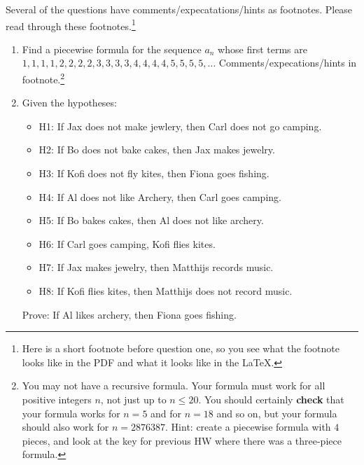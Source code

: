 \documentclass{article}
\begin{document}
\noindent Several of the questions have comments/expecatations/hints as footnotes. Please read through these footnotes.\footnote{Here is a short footnote before question one, so you see what the footnote looks like in the PDF and what it looks like in the LaTeX.}
\begin{enumerate}

    \item Find a piecewise formula for the sequence $a_n$ whose first terms are\vskip1pt
          $1,1,1,1,2,2,2,2,3,3,3,3,4,4,4,4,5,5,5,5,\dots$\vskip1pt
          Comments/expecations/hints in footnote.\footnote{You may not have a recursive
              formula. Your formula must work for all positive integers $n$, not just up to
              $n \leq 20$. You should certainly {\bf check} that your formula works for $n=5$
              and for $n=18$ and so on, but your formula should also work for $n=2876387$.
              Hint: create a piecewise formula with $4$ pieces, and look at the key for
              previous HW where there was a three-piece formula.}

          \newpage

    \item Given the hypotheses:
          \begin{itemize}
              \item H1: If Jax does not make jewlery, then Carl does not go camping. 
              \item H2: If Bo does not bake cakes, then Jax makes jewelry. 
              \item H3: If Kofi does not fly kites, then Fiona goes fishing. 
              \item H4: If Al does not like Archery, then Carl goes camping. 
              \item H5: If Bo bakes cakes, then Al does not like archery. 
              \item H6: If Carl goes camping, Kofi flies kites. 
              \item H7: If Jax makes jewelry, then Matthijs records music. 
              \item H8: If Kofi flies kites, then Matthijs does not record music. 
          \end{itemize}
          Prove: If Al likes archery, then Fiona goes fishing.


\end{enumerate}
\end{document}
